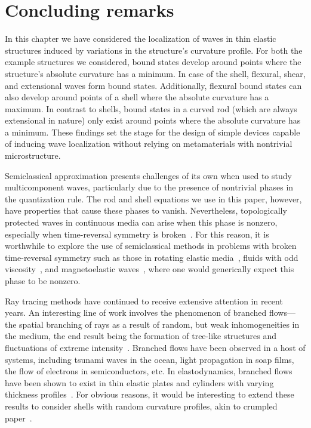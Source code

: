 \section{Concluding remarks}
\label{sec:conclusion}

In this chapter we have considered the localization of waves in thin elastic structures induced by variations in the structure's curvature profile.
For both the example structures we considered, bound states develop around points where the structure's absolute curvature has a minimum.
In case of the shell, flexural, shear, and extensional waves form bound states.
Additionally, flexural bound states can also develop around points of a shell where the absolute curvature has a maximum.
In contrast to shells, bound states in a curved rod (which are always extensional in nature) only exist around points where the absolute curvature has a minimum.
These findings set the stage for the design of simple devices capable of inducing wave localization without relying on metamaterials with nontrivial microstructure.

Semiclassical approximation presents challenges of its own when used to study multicomponent waves, particularly due to the presence of nontrivial phases in the quantization rule.
The rod and shell equations we use in this paper, however, have properties that cause these phases to vanish.
Nevertheless, topologically protected waves in continuous media can arise when this phase is nonzero, especially when time-reversal symmetry is broken~\cite{venaille2023}.
For this reason, it is worthwhile to explore the use of semiclassical methods in problems with broken time-reversal symmetry such as those in rotating elastic media~\cite{marijanovic2022}, fluids with odd viscosity~\cite{souslov2019}, and magnetoelastic waves~\cite{banos1956}, where one would generically expect this phase to be nonzero.

Ray tracing methods have continued to receive extensive attention in recent years.
An interesting line of work involves the phenomenon of branched flows---the spatial branching of rays as a result of random, but weak inhomogeneities in the medium, the end result being the formation of tree-like structures and fluctuations of extreme intensity~\cite{heller2021}.
Branched flows have been observed in a host of systems, including tsunami waves in the ocean, light propagation in soap films, the flow of electrons in semiconductors, etc.
In elastodynamics, branched flows have been shown to exist in thin elastic plates and cylinders with varying thickness profiles~\cite{jose2022,jose2023}.
For obvious reasons, it would be interesting to extend these results to consider shells with random curvature profiles, akin to crumpled paper~\cite{gopinathan2002}.

